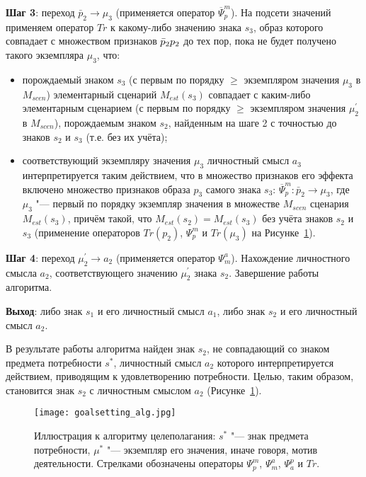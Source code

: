 \textbf{Шаг 3}: переход $\bar p_2\rightarrow\mu_3$ (применяется оператор $\overline{\Psi}_p^m$). На подсети значений применяем оператор $Tr$ к какому-либо значению знака $s_3$, образ которого совпадает с множеством признаков $\bar p_2\\p_2$ до тех пор, пока не будет получено такого экземпляра $\mu_3$, что:
\begin{itemize}
	\item порождаемый знаком $s_3$ (с первым по порядку $\geqslant$ экземпляром значения $\mu_3$ в $M_{scen}$) элементарный сценарий $M_{est}(s_3)$ совпадает с каким-либо элементарным сценарием (с первым по порядку $\geqslant$ экземпляром значения $\mu^\prime_2$ в $M_{scen}$), порождаемым знаком $s_2$, найденным на шаге 2 с точностью до знаков $s_2$ и $s_3$ (т.е. без их учёта);
	\item соответствующий экземпляру значения $\mu_3$ личностный смысл $a_3$ интерпретируется таким действием, что в множество признаков его эффекта включено множество признаков образа $p_3$ самого знака $s_3$: $\overline{\Psi}_p^m:\bar p_2\rightarrow\mu_3$, где $\mu_3$ "--- первый по порядку экземпляр значения в множестве $M_{scen}$ сценария $M_{est}(s_3)$, причём   такой, что $M_{est}(s_2)=M_{est}(s_3)$ без учёта знаков $s_2$ и $s_3$ (применение операторов $Tr(p_2)$, $\Psi_p^m$ и $Tr(\mu_3)$ на Рисунке~\ref{fg:goalsetting_alg}).
\end{itemize}

\textbf{Шаг 4}: переход $\mu^\prime_2\rightarrow a_2$ (применяется оператор $\Psi_m^a$). Нахождение личностного смысла $a_2$, соответствующего значению $\mu^\prime_2$ знака $s_2$. Завершение работы алгоритма.

\textbf{Выход}: либо знак $s_1$ и его личностный смысл $a_1$, либо знак $s_2$ и его личностный смысл $a_2$.

В результате работы алгоритма найден знак $s_2$, не совпадающий со знаком предмета потребности $s^*$, личностный смысл $a_2$ которого интерпретируется действием, приводящим к удовлетворению потребности. Целью, таким образом, становится знак $s_2$ с личностным смыслом $a_2$ (Рисунке~\ref{fg:goalsetting_alg}).

\begin{figure}[h]
	\centering
	\texttt{[image: goalsetting\_alg.jpg]}
	\caption[]{Иллюстрация к алгоритму целеполагания: $s^*$ "--- знак предмета потребности, $\mu^*$ "--- экземпляр его значения, иначе говоря, мотив деятельности. Стрелками обозначены операторы $\Psi_p^m$, $\Psi_m^a$, $\Psi_a^p$ и $Tr$.}
	\label{fg:goalsetting_alg}
\end{figure}

